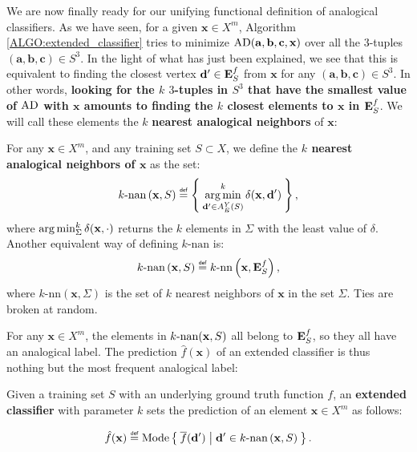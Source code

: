 We are now finally ready for our unifying functional definition of analogical
classifiers. As we have seen, for a given $\mathbf{x} \in X^m$, Algorithm
\ref{ALGO:extended_classifier} tries to minimize
$\text{AD}(\mathbf{a},\mathbf{b},\mathbf{c},\mathbf{x})$ over all the $3$-tuples
$(\mathbf{a},\mathbf{b},\mathbf{c}) \in S^3$. In the light of what has just
been explained, we see that this is equivalent to finding the closest vertex
$\mathbf{d}' \in \mathbf{E}_{S}^{f}$ from $\mathbf{x}$ for any $(\mathbf{a}, \mathbf{b},
\mathbf{c}) \in S^3$. In other words, \textbf{looking for the $k$ $3$-tuples in
$S^3$ that have the smallest value of $\text{AD}$ with $\mathbf{x}$ amounts to
finding the $k$ closest elements to $\mathbf{x}$ in $\mathbf{E}_{S}^{f}$}. We will call these
elements the $k$ \textbf{nearest analogical neighbors} of $\mathbf{x}$:

\begin{definition}
  \label{DEF:knan}
  For any $\mathbf{x} \in X^m$, and any training set $S \subset X$, we define
  the \textbf{$k$ nearest analogical neighbors of $\mathbf{x}$} as the set:
  $$k\text{-nan}\left(\mathbf{x}, S\right) \eqdef \Set{\argmin_{\mathbf{d}' \in
  A_E^Y(S)}^k
  \delta(\mathbf{x},\mathbf{d}')},
  $$
  where $\operatorname*{arg\,min}_{\Sigma}^k \delta(\mathbf{x}, \cdot)$ returns the $k$ elements in $\Sigma$
  with the least value of $\delta$.
  Another equivalent way of defining $k\text{-nan}$ is:
  $$k\text{-nan}\left(\mathbf{x}, S\right) \eqdef k\text{-nn}\left(\mathbf{x},
  \esf\right),$$
  where $k\text{-nn}\left(\mathbf{x},\Sigma\right)$ is the set of $k$ nearest
  neighbors of $\mathbf{x}$ in the set $\Sigma$. Ties are broken at random.
\end{definition}

For any $\mathbf{x} \in X^m$, the elements in $k\text{-nan}(\mathbf{x}, S)$ all belong
to $\mathbf{E}_{S}^{f}$, so they all have an analogical label. The prediction
$\hat{f}(\mathbf{x})$ of an extended classifier is thus nothing but the most
frequent analogical label:

\begin{definition}
  \label{DEF:extended_classifier}
  Given a training set $S$ with an underlying ground truth function $f$,
  an \textbf{extended classifier} with parameter $k$ sets the prediction of an element
  $\mathbf{x} \in X^m$ as follows:

  $$\hat{f}(\mathbf{x}) \eqdef \text{Mode}\Set{\albl{\mathbf{d}'} | \mathbf{d}'
  \in k\text{-nan}\left(\mathbf{x}, S\right)}.
  $$
\end{definition}

